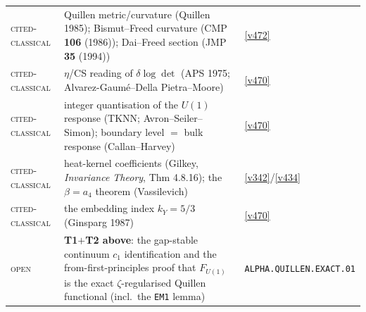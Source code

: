 \begin{center}
\begin{tabularx}{\linewidth}{@{}l>{\hsize=1.45\hsize\raggedright\arraybackslash}X>{\hsize=0.55\hsize\raggedright\arraybackslash}X@{}}
\textsc{cited-classical} & Quillen metric/curvature (Quillen 1985); Bismut--Freed curvature (CMP \textbf{106} (1986)); Dai--Freed section (JMP \textbf{35} (1994)) & \vref{v472} \\
\textsc{cited-classical} & $\eta$/CS reading of $\delta\log\det$ (APS 1975; Alvarez-Gaum\'e--Della Pietra--Moore) & \vref{v470} \\
\textsc{cited-classical} & integer quantisation of the $U(1)$ response (TKNN; Avron--Seiler--Simon); boundary level $=$ bulk response (Callan--Harvey) & \vref{v470} \\
\textsc{cited-classical} & heat-kernel coefficients (Gilkey, \emph{Invariance Theory}, Thm 4.8.16); the $\beta=a_4$ theorem (Vassilevich) & \vref{v342}/\vref{v434} \\
\textsc{cited-classical} & the embedding index $k_Y=5/3$ (Ginsparg 1987) & \vref{v470} \\
\textsc{open} & \textbf{T1$+$T2 above}: the gap-stable continuum $c_1$ identification and the from-first-principles proof that $F_{U(1)}$ is the exact $\zeta$-regularised Quillen functional (incl.\ the \texttt{EM1} lemma) & \texttt{ALPHA.QUILLEN.EXACT.01} \\
\bottomrule
\end{tabularx}
\end{center}

